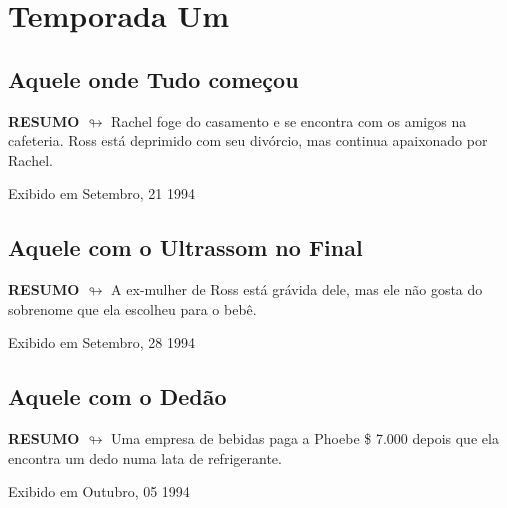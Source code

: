 \part{Temporada Um}

\chapter{Aquele onde Tudo começou}

\textbf{RESUMO $\looparrowright$} Rachel foge do casamento e se encontra com os amigos na cafeteria. Ross está deprimido com seu divórcio, mas continua apaixonado por Rachel.

\begin{flushright}
\textcolor{gray600}{Exibido em Setembro, 21 1994}
\end{flushright}


\chapter{Aquele com o Ultrassom no Final}

\textbf{RESUMO $\looparrowright$} A ex-mulher de Ross está grávida dele, mas ele não gosta do sobrenome que ela escolheu para o bebê.

\begin{flushright}
\textcolor{gray600}{Exibido em Setembro, 28 1994}
\end{flushright}


\chapter{Aquele com o Dedão}

\textbf{RESUMO $\looparrowright$} Uma empresa de bebidas paga a Phoebe \$ 7.000 depois que ela encontra um dedo numa lata de refrigerante.

\begin{flushright}
\textcolor{gray600}{Exibido em Outubro, 05 1994}
\end{flushright}


